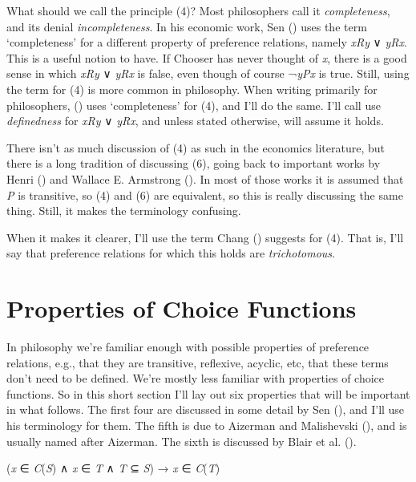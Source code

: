 \documentclass[
  11pt,
  letterpaper,
  DIV=11,
  numbers=noendperiod,
  twoside]{scrartcl}
\providecommand{\tightlist}{%
  \setlength{\itemsep}{0pt}\setlength{\parskip}{0pt}}
\begin{document}
What should we call the principle (4)? Most philosophers call it
\emph{completeness}, and its denial \emph{incompleteness}. In his
economic work, Sen () uses the
term `completeness' for a different property of preference relations,
namely \emph{xRy} ∨ \emph{yRx}. This is a useful notion to have. If
Chooser has never thought of \emph{x}, there is a good sense in which
\emph{xRy} ∨ \emph{yRx} is false, even though of course ¬\emph{yPx} is
true. Still, using the term for (4) is more common in philosophy. When
writing primarily for philosophers,
() uses `completeness' for (4),
and I'll do the same. I'll call use \emph{definedness} for \emph{xRy} ∨
\emph{yRx}, and unless stated otherwise, will assume it holds.

There isn't as much discussion of (4) as such in the economics
literature, but there is a long tradition of discussing (6), going back
to important works by Henri
() and Wallace E.
Armstrong (). In most of those works
it is assumed that \emph{P} is transitive, so (4) and (6) are
equivalent, so this is really discussing the same thing. Still, it makes
the terminology confusing.

When it makes it clearer, I'll use the term Chang
() suggests for (4). That is, I'll say
that preference relations for which this holds are \emph{trichotomous}.

\section{Properties of Choice Functions}\label{sec-properties}

In philosophy we're familiar enough with possible properties of
preference relations, e.g., that they are transitive, reflexive,
acyclic, etc, that these terms don't need to be defined. We're mostly
less familiar with properties of choice functions. So in this short
section I'll lay out six properties that will be important in what
follows. The first four are discussed in some detail by Sen
(), and I'll use his
terminology for them. The fifth is due to Aizerman and Malishevski
(), and is usually named after
Aizerman. The sixth is discussed by Blair et al.
().

\begin{description}
\tightlist
\item[Property α]
(\emph{x} ∈ \emph{C}(\emph{S}) ∧ \emph{x} ∈ \emph{T} ∧ \emph{T} ⊆
\emph{S}) → \emph{x} ∈ \emph{C}(\emph{T})
\end{description}
\end{document}
